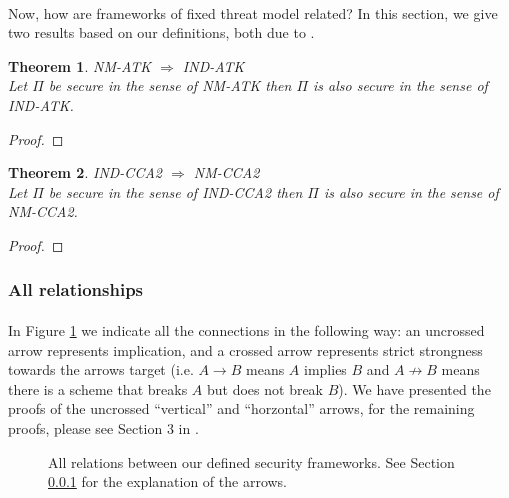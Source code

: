 \documentclass{article}
\newtheorem{theorem}{Theorem}[section]
\theoremstyle{definition}
\begin{document}
\paragraph{} Now, how are frameworks of fixed threat model related? In this
section, we give two results based on our definitions, both due to \cite{bellaresecurityrelations}.
\begin{theorem}{NM-ATK $\Rightarrow$ IND-ATK}\\
  Let $\Pi$ be secure in the sense of NM-ATK then $\Pi$ is also secure in the
  sense of IND-ATK.
\end{theorem}
\begin{proof}
\end{proof}
\begin{theorem}{IND-CCA2 $\Rightarrow$ NM-CCA2}\\
  Let $\Pi$ be secure in the sense of IND-CCA2 then $\Pi$ is also secure in the
  sense of NM-CCA2.
\end{theorem}
\begin{proof}
\end{proof}
\subsubsection{All relationships}
\label{sec:allrelations}
\paragraph{} In Figure \ref{fig:secrelations} we indicate all the connections in the following way:
an uncrossed arrow represents implication, and a crossed arrow represents strict
strongness towards the arrows target (i.e. $A \rightarrow B$ means $A$ implies
$B$ and $A \not\rightarrow B$ means there is a scheme that breaks $A$ but does
not break $B$). We have presented the proofs of the uncrossed ``vertical'' and
``horzontal'' arrows, for the remaining proofs, please see Section 3 in \cite{bellaresecurityrelations}.
\begin{figure}
  \centering
  \caption{All relations between our defined security frameworks. See Section
    \ref{sec:allrelations} for the explanation of the arrows.}
  \label{fig:secrelations}
\end{figure}
\end{document}
